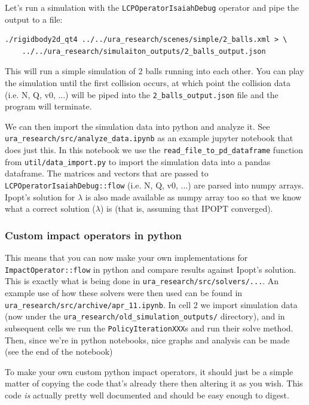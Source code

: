 \documentclass[12pt]{article}
\begin{document}
Let's run a simulation with the \texttt{LCPOperatorIsaiahDebug} operator
and pipe the output to a file:

\begin{verbatim}
./rigidbody2d_qt4 ../../ura_research/scenes/simple/2_balls.xml > \
    ../../ura_research/simulaiton_outputs/2_balls_output.json
\end{verbatim}

This will run a simple simulation of 2 balls running into each other.
You can play the simulation until the first collision occurs, at which point the collision data
(i.e. N, Q, v0, ...) will be piped into the \texttt{2\_balls\_output.json} file and the program will terminate.

We can then import the simulation data into python and analyze it.
See \texttt{ura\_research/src/analyze\_data.ipynb} as an example jupyter notebook that does just this.
In this notebook we use the \texttt{read\_file\_to\_pd\_dataframe} function from \texttt{util/data\_import.py}
to import the simulation data into a pandas dataframe.
The matrices and vectors that are passed to \texttt{LCPOperatorIsaiahDebug::flow} (i.e. N, Q, v0, ...)
are parsed into numpy arrays.
Ipopt's solution for $\lambda$ is also made available as numpy array too so that we know what a correct solution ($\lambda$) is
(that is, assuming that IPOPT converged).

\subsubsection{Custom impact operators in python}

This means that you can now make your own implementations for \texttt{ImpactOperator::flow} in python
and compare results against Ipopt's solution.
This is exactly what is being done in \texttt{ura\_research/src/solvers/...}.
An example use of how these solvers were then used can be found in \texttt{ura\_research/src/archive/apr\_11.ipynb}.
In cell 2 we import simulation data (now under the \texttt{ura\_research/old\_simulation\_outputs/} directory),
and in subsequent cells we run the \texttt{PolicyIterationXXX}s and run their solve method.
Then, since we're in python notebooks, nice graphs and analysis can be made (see the end of the notebook)

To make your own custom python impact operators, it should just be a simple matter of
copying the code that's already there then altering it as you wish. This code \textit{is}
actually pretty well documented and should be easy enough to digest.
\end{document}
